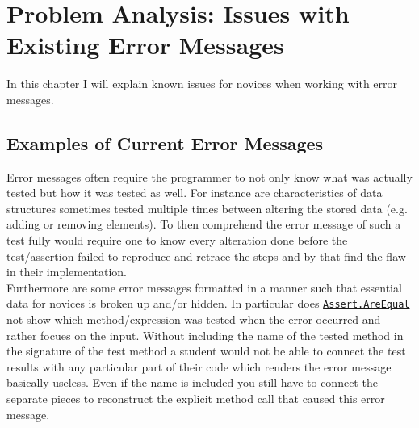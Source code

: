 \chapter{Problem Analysis: Issues with Existing Error Messages} %
\label{sctn:errorMessages} %




In this chapter I will explain known issues for novices when working with error messages.


\section{Examples of Current Error Messages} %



Error messages often require the programmer to not only know what was actually tested but how it was tested as well.
For instance are characteristics of data structures sometimes tested multiple times between altering the stored data (e.g. adding or removing elements).
To then comprehend the error message of such a test fully would require one to know every alteration done before the test/assertion failed to reproduce and retrace the steps
and by that find the flaw in their implementation.\\[5pt]
Furthermore are some error messages formatted in a manner such that essential data for novices is broken up and/or hidden.
In particular does \href{https://learn.microsoft.com/en-us/dotnet/api/microsoft.visualstudio.testtools.unittesting.assert.areequal?view=mstest-net-3.8}{\texttt{Assert.AreEqual}}
not show which method/expression was tested when the error occurred and rather focues on the input.
Without including the name of the tested method in the signature of the test method a student would not be able to connect the test results with any particular part of their code which renders the error message basically useless.
Even if the name is included you still have to connect the separate pieces to reconstruct the explicit method call that caused this error message.


